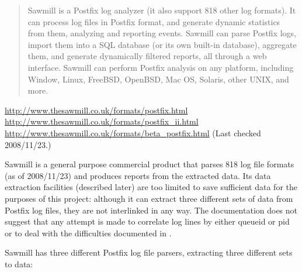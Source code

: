 \begin{quotation}

    Sawmill is a Postfix log analyzer (it also support 818 other log
    formats). It can process log files in Postfix format, and generate
    dynamic statistics from them, analyzing and reporting events. Sawmill
    can parse Postfix logs, import them into a SQL database (or its own
    built-in database), aggregate them, and generate dynamically filtered
    reports, all through a web interface. Sawmill can perform Postfix
    analysis on any platform, including Window, Linux, FreeBSD, OpenBSD,
    Mac OS, Solaris, other UNIX, and more.

\end{quotation}

\noindent{}\url{http://www.thesawmill.co.uk/formats/postfix.html}
\newline{} \url{http://www.thesawmill.co.uk/formats/postfix_ii.html}
\newline{} \url{http://www.thesawmill.co.uk/formats/beta_postfix.html}
\newline{} (Last checked 2008/11/23.)

Sawmill is a general purpose commercial product that parses 818 log file
formats (as of 2008/11/23) and produces reports from the extracted data.
Its data extraction facilities (described later) are too limited to save
sufficient data for the purposes of this project: although it can extract
three different sets of data from Postfix log files, they are not
interlinked in any way.  The documentation does not suggest that any
attempt is made to correlate log lines by either queueid or pid or to deal
with the difficulties documented in .

Sawmill has three different Postfix log file parsers, extracting three
different sets to data:

